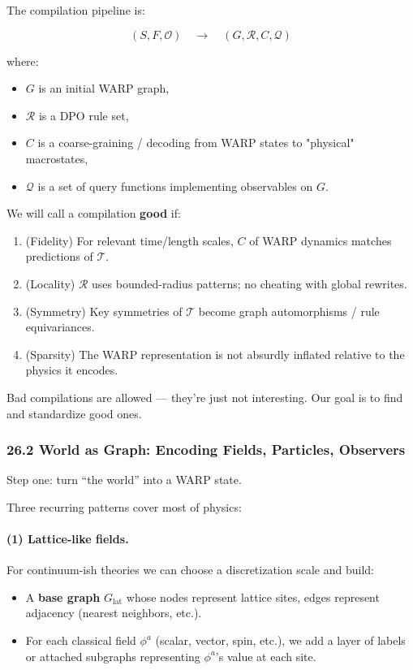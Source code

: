 The compilation pipeline is:

\[
  (S, F, \mathcal{O})
  \quad\longrightarrow\quad
  (G, \mathcal{R}, C, \mathcal{Q})
\]

where:

\begin{itemize}
  \item $G$ is an initial WARP graph,
  \item $\mathcal{R}$ is a DPO rule set,
  \item $C$ is a coarse-graining / decoding from WARP states to "physical" macrostates,
  \item $\mathcal{Q}$ is a set of query functions implementing observables on $G$.
\end{itemize}

We will call a compilation \textbf{good} if:

\begin{enumerate}
  \item (Fidelity) For relevant time/length scales, $C$ of WARP dynamics matches predictions of $\mathcal{T}$.
  \item (Locality) $\mathcal{R}$ uses bounded-radius patterns; no cheating with global rewrites.
  \item (Symmetry) Key symmetries of $\mathcal{T}$ become graph automorphisms / rule equivariances.
  \item (Sparsity) The WARP representation is not absurdly inflated relative to the physics it encodes.
\end{enumerate}

Bad compilations are allowed — they’re just not interesting. Our goal is to find
and standardize good ones.

\subsubsection*{26.2  World as Graph: Encoding Fields, Particles, Observers}

Step one: turn “the world” into a WARP state.

Three recurring patterns cover most of physics:

\paragraph{(1) Lattice-like fields.}

For continuum-ish theories we can choose a discretization scale and build:

\begin{itemize}
  \item A \textbf{base graph} $G_\text{lat}$ whose nodes represent lattice sites,
        edges represent adjacency (nearest neighbors, etc.).

  \item For each classical field $\phi^a$ (scalar, vector, spin, etc.), we add a
        layer of labels or attached subgraphs representing $\phi^a$'s value at each site.
\end{itemize}

